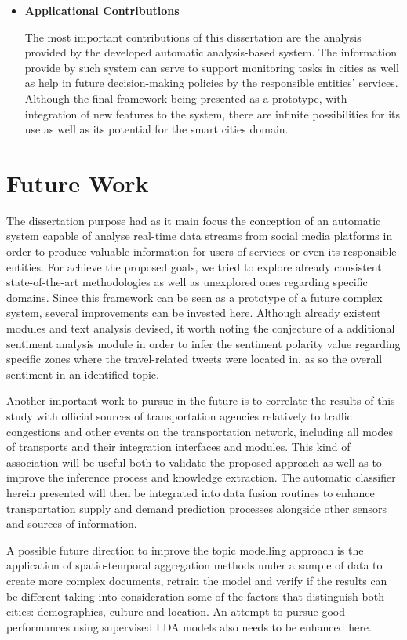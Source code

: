 \begin{itemize}
	\item \textbf{Applicational Contributions}
	
	The most important contributions of this dissertation are the analysis provided by the developed automatic analysis-based system. The information provide by such system can serve to support monitoring tasks in cities as well as help in future decision-making policies by the responsible entities' services. Although the final framework being presented as a prototype, with integration of new features to the system, there are infinite possibilities for its use as well as its potential for the smart cities domain.
\end{itemize}

\section{Future Work}

The dissertation purpose had as it main focus the conception of an automatic system capable of analyse real-time data streams from social media platforms in order to produce valuable information for users of services or even its responsible entities. For achieve the proposed goals, we tried to explore already consistent state-of-the-art methodologies as well as unexplored ones regarding specific domains. Since this framework can be seen as a prototype of a future complex system, several improvements can be invested here. Although already existent modules and text analysis devised, it worth noting the conjecture of a additional sentiment analysis module in order to infer the sentiment polarity value regarding specific zones where the travel-related tweets were located in, as so the overall sentiment in an identified topic.

Another important work to pursue in the future is to correlate the results of this study with official sources of transportation agencies relatively to traffic congestions and other events on the transportation network, including all modes of transports and their integration interfaces and modules. This kind of association will be useful both to validate the proposed approach as well as to improve the inference process and knowledge extraction. The automatic classifier herein presented will then be integrated into data fusion routines to enhance transportation supply and demand prediction processes alongside other sensors and sources of information.

A possible future direction to improve the topic modelling approach is the application of spatio-temporal aggregation methods under a sample of data to create more complex documents, retrain the model and verify if the results can be different taking into consideration some of the factors that distinguish both cities: demographics, culture and location. An attempt to pursue good performances using supervised LDA models also needs to be enhanced here.

